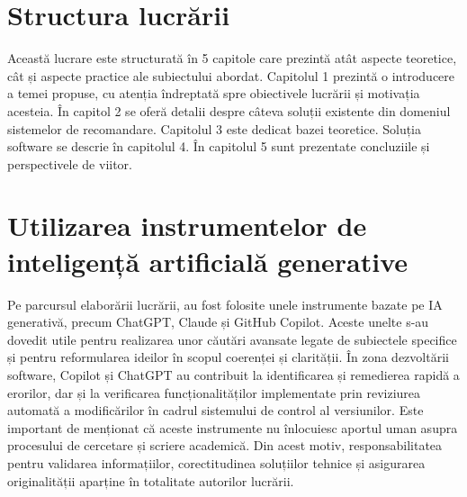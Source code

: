 \section{Structura lucrării}
\label{section:ch1sec3}

Această lucrare este structurată în 5 capitole care prezintă atât aspecte teoretice, cât și aspecte practice ale subiectului abordat. 
Capitolul 1 prezintă o introducere a temei propuse, cu atenția îndreptată spre obiectivele lucrării și motivația acesteia. 
În capitol 2 se oferă detalii despre câteva soluții existente din domeniul sistemelor de recomandare.
Capitolul 3 este dedicat bazei teoretice.
Soluția software se descrie în capitolul 4. 
În capitolul 5 sunt prezentate concluziile și perspectivele de viitor.

\section{Utilizarea instrumentelor de inteligență artificială generative}
\label{section:ch1sec4}
Pe parcursul elaborării lucrării, au fost folosite unele instrumente bazate pe IA generativă, precum ChatGPT, Claude și GitHub Copilot.
Aceste unelte s-au dovedit utile pentru realizarea unor căutări avansate legate de subiectele specifice și pentru reformularea ideilor în scopul coerenței și clarității.
În zona dezvoltării software, Copilot și ChatGPT au contribuit la identificarea și remedierea rapidă a erorilor, dar și la verificarea funcționalităților implementate prin reviziurea automată a modificărilor în cadrul sistemului de control al versiunilor.
Este important de menționat că aceste instrumente nu înlocuiesc aportul uman asupra procesului de cercetare și scriere academică.
Din acest motiv, responsabilitatea pentru validarea informațiilor, corectitudinea soluțiilor tehnice și asigurarea originalității aparține în totalitate autorilor lucrării.


